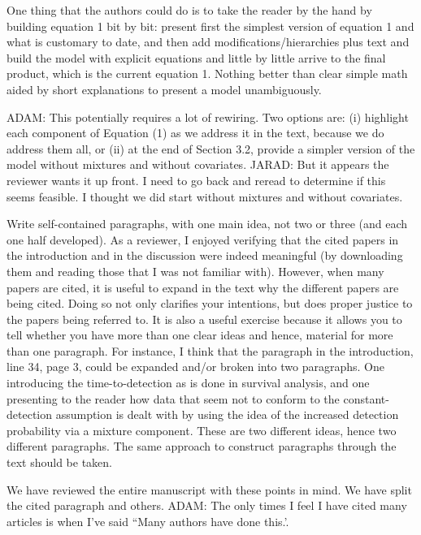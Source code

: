 \documentclass[12pt]{article}
\renewenvironment{quote}  %
              {\list{}{\rightmargin\leftmargin}\normalfont%
               \item\relax}
              {\endlist}
\newcommand{\adam}[1]{{\color{blue} ADAM: #1}}
\newcommand{\jarad}[1]{{\color{Orange} JARAD: #1}}
\begin{document}
One thing that the authors could do is to take the reader by the hand by building equation 1 bit by bit: present first the simplest version of equation 1 and what is customary to date, and then add modifications/hierarchies plus text and build the model with explicit equations and little by little arrive to the final product, which is the current equation 1. Nothing better than clear simple math aided by short explanations to present a model unambiguously.
\begin{quote}
\adam{
This potentially requires a lot of rewiring.  Two options are: (i) highlight each component of Equation (1) as we address it in the text, because we do address them all, or (ii) at the end of Section 3.2, provide a simpler version of the model without mixtures and without covariates.
}
\jarad{But it appears the reviewer wants it up front. 
I need to go back and reread to determine if this seems feasible. 
I thought we did start without mixtures and without covariates.}
\end{quote}

Write self-contained paragraphs, with one main idea, not two or three (and each one half developed). As a reviewer, I enjoyed verifying that the cited papers in the introduction and in the discussion were indeed meaningful (by downloading them and reading those that I was not familiar with). However, when many papers are cited, it is useful to expand in the text why the different papers are being cited.  Doing so not only clarifies your intentions, but does proper justice to the papers being referred to. It is also a useful exercise because it allows you to tell whether you have more than one clear ideas and hence, material for more than one paragraph.  For instance, I think that the paragraph in the introduction, line 34, page 3, could be expanded and/or broken into two paragraphs.  One introducing the time-to-detection as is done in survival analysis, and one presenting to the reader how data that seem not to conform to the constant-detection assumption is dealt with by
using the idea of the increased detection probability via a mixture component. These are two different ideas, hence two different paragraphs. The same approach to construct paragraphs through the text should be taken.
\begin{quote}
We have reviewed the entire manuscript with these points in mind.
We have split the cited paragraph and others.
\adam{The only times I feel I have cited many articles is when I've said ``Many authors have done this.'.}
\end{quote}
\end{document}

